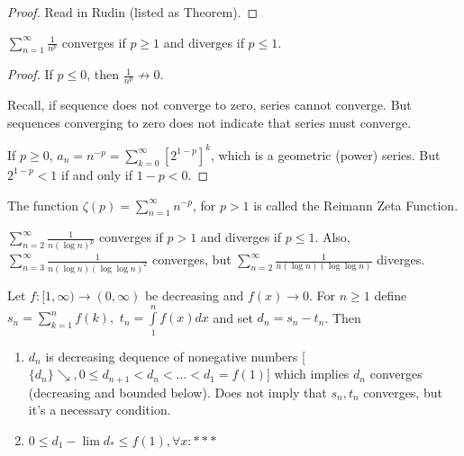 \documentclass[11pt,fleqn]{book} %
\begin{document}
\begin{proof}
	Read in Rudin (listed as Theorem).
\end{proof}

\begin{theorem}
	$\sum\limits^\infty_{n=1} \frac{1}{n^p}$ converges if $p \ge 1$ and diverges if $p \le 1$.
\end{theorem}

\begin{proof}
	If $p \le 0$, then $\frac{1}{n^p} \not\rightarrow 0$.

	Recall, if sequence does not converge to zero, series cannot converge. But sequences converging to zero does not indicate that series must converge.

	If $p \ge 0$, $a_n = n^{-p} = \sum\limits^\infty_{k=0} [2^{1-p}]^k$, which is a geometric (power) series. But $2^{1-p} < 1$ if and only if $1-p <0$.
\end{proof}

\begin{remark}
	The function $\zeta(p) = \sum\limits^\infty_{n=1} n^{-p}$, for $p >1$ is called the Reimann Zeta Function. 
\end{remark}

\begin{theorem}
	$\sum\limits^\infty_{n=2} \frac{1}{n(\log n)^p}$ converges if $p > 1$ and diverges if $p \le 1$. Also, 
	$\sum\limits^\infty_{n=3} \frac{1}{n(\log n)(\log\log n)^2}$ converges, but 
	$\sum\limits^\infty_{n=2} \frac{1}{n(\log n)(\log\log n)}$ diverges.
\end{theorem}

\begin{theorem}
	Let $f: [1, \infty) \rightarrow (0,\infty)$ be decreasing and $f(x) \rightarrow 0$. For $n\ge 1$ define $s_n = \sum\limits^n_{k=1} f(k),$ $t_n = \int\limits^n_1 f(x) dx$ and set $d_n = s_n - t_n$. Then
	\begin{enumerate}[label = \roman*)]
		\item $d_n$ is decreasing dequence of nonegative numbers [$\{d_n\} \searrow, 0 \le d_{n+1} < d_n < \dots < d_1 = f(1)$] which implies $d_n$ converges (decreasing and bounded below). Does not imply that $s_n, t_n$ converges, but it's a necessary condition.
		\item $0 \le d_1 - \lim d_* \le f(1), \forall x:***$
	\end{enumerate}
\end{theorem}
\end{document}
